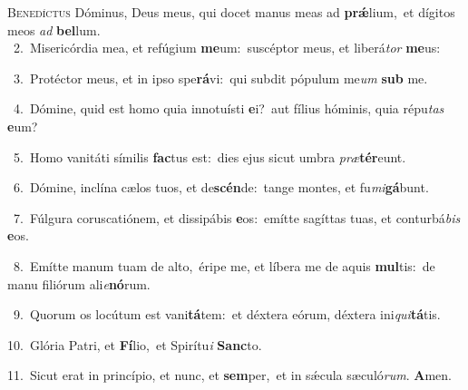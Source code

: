 \lettrine{\initial\textcolor{\initialcolor}{B}}{enedíctus} Dóminus, Deus meus, qui docet manus meas ad \textbf{prǽ}\-lium,~\star et dígitos meos \textit{ad} \textbf{bel}\-lum.\\
{\numbfont\textcolor{\numbcolor}{~2.}}~Misericórdia mea, et refúgium \textbf{me}\-um:~\star suscéptor meus, et liberá\textit{tor} \textbf{me}\-us:\par
{\numbfont\textcolor{\numbcolor}{~3.}}~Protéctor meus, et in ipso spe\-\textbf{rá}\-vi:~\star qui subdit pópulum me\textit{um} \textbf{sub} me.\par
{\numbfont\textcolor{\numbcolor}{~4.}}~Dómine, quid est homo quia innotuísti \textbf{e}\-i?~\star aut fílius hóminis, quia répu\textit{tas} \textbf{e}\-um?\par
{\numbfont\textcolor{\numbcolor}{~5.}}~Homo vanitáti símilis \textbf{fac}\-tus est:~\star dies ejus sicut umbra \textit{præ}\-\textbf{tér}eunt.\par
{\numbfont\textcolor{\numbcolor}{~6.}}~Dómine, inclína cælos tuos, et de\-\textbf{scén}\-de:~\star tange montes, et fu\-\textit{mi}\-\textbf{gá}bunt.\par
{\numbfont\textcolor{\numbcolor}{~7.}}~Fúlgura coruscatiónem, et dissipábis \textbf{e}\-os:~\star emítte sagíttas tuas, et conturbá\textit{bis} \textbf{e}\-os.\par
{\numbfont\textcolor{\numbcolor}{~8.}}~Emítte manum tuam de alto,~\dagger éripe me, et líbera me de aquis \textbf{mul}\-tis:~\star de manu filiórum ali\-\textit{e}\-\textbf{nó}rum.\par
{\numbfont\textcolor{\numbcolor}{~9.}}~Quorum os locútum est vani\-\textbf{tá}\-tem:~\star et déxtera eórum, déxtera ini\-\textit{qui}\-\textbf{tá}tis.\par
{\numbfont\textcolor{\numbcolor}{10.}}~Glória Patri, et \textbf{Fí}\-lio,~\star et Spirítu\textit{i} \textbf{Sanc}\-to.\par
{\numbfont\textcolor{\numbcolor}{11.}}~Sicut erat in princípio, et nunc, et \textbf{sem}\-per,~\star et in sǽcula sæculó\-\textit{rum}\-. \textbf{A}\-men.\par
